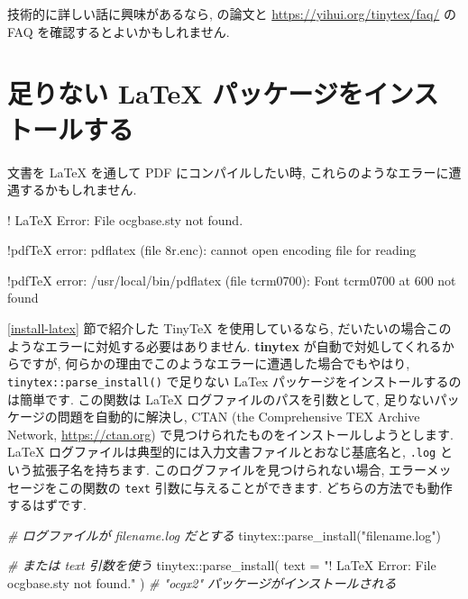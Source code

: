 \documentclass[
  11pt,
  lualatex,
  ja=standard]{bxjsreport}
\newenvironment{Shaded}{\begin{snugshade}}{\end{snugshade}}
\newcommand{\AttributeTok}[1]{\textcolor[rgb]{0.77,0.63,0.00}{#1}}
\newcommand{\CommentTok}[1]{\textcolor[rgb]{0.56,0.35,0.01}{\textit{#1}}}
\newcommand{\FunctionTok}[1]{\textcolor[rgb]{0.00,0.00,0.00}{#1}}
\newcommand{\NormalTok}[1]{#1}
\newcommand{\SpecialCharTok}[1]{\textcolor[rgb]{0.00,0.00,0.00}{#1}}
\newcommand{\StringTok}[1]{\textcolor[rgb]{0.31,0.60,0.02}{#1}}
\begin{document}
技術的に詳しい話に興味があるなら, \textcite{tinytex2019} の論文と \url{https://yihui.org/tinytex/faq/} の FAQ を確認するとよいかもしれません.

\hypertarget{install-latex-pkgs}{%
\section{足りない LaTeX パッケージをインストールする}\label{install-latex-pkgs}}

文書を LaTeX を通して PDF にコンパイルしたい時, これらのようなエラーに遭遇するかもしれません.

\begin{Shaded}
\begin{Highlighting}[]
\NormalTok{! LaTeX Error: File \textasciigrave{}ocgbase.sty\textquotesingle{} not found.}

\NormalTok{!pdfTeX error: pdflatex (file 8r.enc):}
\NormalTok{  cannot open encoding file for reading}

\NormalTok{!pdfTeX error: /usr/local/bin/pdflatex (file tcrm0700):}
\NormalTok{  Font tcrm0700 at 600 not found}
\end{Highlighting}
\end{Shaded}

\ref{install-latex} 節で紹介した TinyTeX を使用しているなら, だいたいの場合このようなエラーに対処する必要はありません. \textbf{tinytex} \autocite{R-tinytex} が自動で対処してくれるからですが, 何らかの理由でこのようなエラーに遭遇した場合でもやはり, \texttt{tinytex::parse\_install()} で足りない LaTex パッケージをインストールするのは簡単です. この関数は LaTeX ログファイルのパスを引数として, 足りないパッケージの問題を自動的に解決し, CTAN (the Comprehensive TEX Archive Network, \url{https://ctan.org}) で見つけられたものをインストールしようとします. LaTeX ログファイルは典型的には入力文書ファイルとおなじ基底名と, \texttt{.log} という拡張子名を持ちます. このログファイルを見つけられない場合, エラーメッセージをこの関数の \texttt{text} 引数に与えることができます. どちらの方法でも動作するはずです.

\begin{Shaded}
\begin{Highlighting}[numbers=left,,]
\CommentTok{\# ログファイルが filename.log だとする}
\NormalTok{tinytex}\SpecialCharTok{::}\FunctionTok{parse\_install}\NormalTok{(}\StringTok{"filename.log"}\NormalTok{)}

\CommentTok{\# または \textasciigrave{}text\textasciigrave{} 引数を使う}
\NormalTok{tinytex}\SpecialCharTok{::}\FunctionTok{parse\_install}\NormalTok{(}
  \AttributeTok{text =} \StringTok{"! LaTeX Error: File \textasciigrave{}ocgbase.sty\textquotesingle{} not found."}
\NormalTok{)}
\CommentTok{\# "ocgx2" パッケージがインストールされる}
\end{Highlighting}
\end{Shaded}
\end{document}
